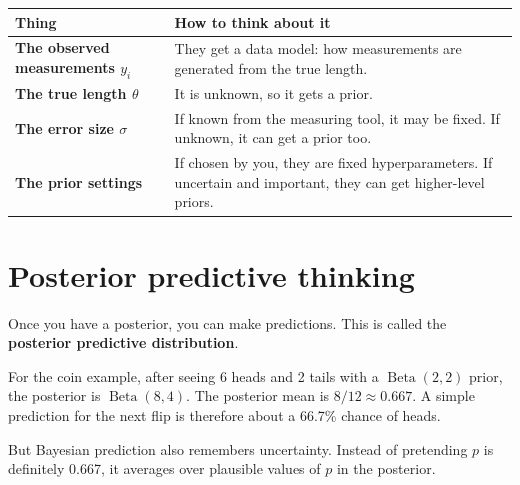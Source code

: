\documentclass[11pt]{article}
\begin{document}
\begin{center}
\begin{tabularx}{\textwidth}{>{\bfseries}p{} X}
\toprule
Thing & How to think about it \\
\midrule
The observed measurements $y_i$ & They get a data model: how measurements are generated from the true length. \\
The true length $\theta$ & It is unknown, so it gets a prior. \\
The error size $\sigma$ & If known from the measuring tool, it may be fixed. If unknown, it can get a prior too. \\
The prior settings & If chosen by you, they are fixed hyperparameters. If uncertain and important, they can get higher-level priors. \\
\bottomrule
\end{tabularx}
\end{center}

\section{Posterior predictive thinking}

Once you have a posterior, you can make predictions. This is called the \textbf{posterior predictive distribution}.

For the coin example, after seeing 6 heads and 2 tails with a $\operatorname{Beta}(2,2)$ prior, the posterior is $\operatorname{Beta}(8,4)$. The posterior mean is $8/12\approx 0.667$. A simple prediction for the next flip is therefore about a 66.7\% chance of heads.

But Bayesian prediction also remembers uncertainty. Instead of pretending $p$ is definitely 0.667, it averages over plausible values of $p$ in the posterior.

\begin{center}
\end{center}
\end{document}
